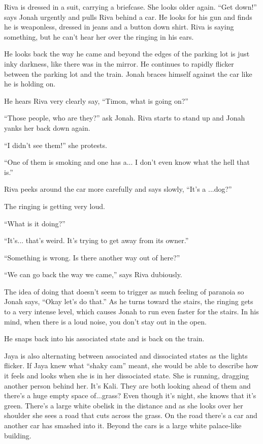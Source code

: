 Riva is dressed in a suit, carrying a briefcase. She looks older again.  ``Get down!'' says Jonah urgently and pulls Riva behind a car.  He looks for his gun and finds he is weaponless, dressed in jeans and a button down shirt.  Riva is saying something, but he can't hear her over the ringing in his ears.



He looks back the way he came and beyond the edges of the parking lot is just inky darkness, like there was in the mirror.  He continues to rapidly flicker between the parking lot and the train.  Jonah braces himself against the car like he is holding on.   

He hears Riva very clearly say, ``Timon, what is going on?''

``Those people, who are they?'' ask Jonah.  Riva starts to stand up and Jonah yanks her back down again.

``I didn't see them!'' she protests.

``One of them is smoking and one has a... I don't even know what the hell that is.''

Riva peeks around the car more carefully and says slowly, ``It's a ...dog?''

The ringing is getting very loud.

``What is it doing?''

``It's... that's weird.  It's trying to get away from its owner.''

``Something is wrong.  Is there another way out of here?''

``We can go back the way we came,'' says Riva dubiously.

The idea of doing that doesn't seem to trigger as much feeling of paranoia so Jonah says, ``Okay let's do that.''  As he turns toward the stairs, the ringing gets to a very intense level, which causes Jonah to run even faster for the stairs.  In his mind, when there is a loud noise, you don't stay out in the open.



He snaps back into his associated state and is back on the train.



Jaya is also alternating between associated and dissociated states as the lights flicker.  If Jaya knew what ``shaky cam'' meant, she would be able to describe how it feels and looks when she is in her dissociated state.  She is running, dragging another person behind her.  It's Kali.  They are both looking ahead of them and there's a huge empty space of...grass?  Even though it's night, she knows that it's green.  There's a large white obelisk in the distance and as she looks over her shoulder she sees a road that cuts across the grass.  On the road there's a car and another car has smashed into it.  Beyond the cars is a large white palace-like building.



